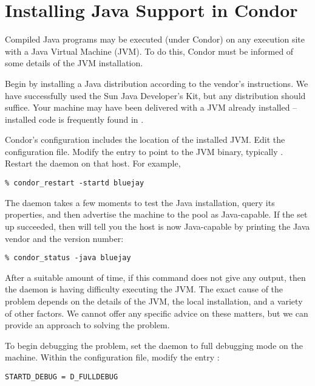 \section{\label{sec:java-install}Installing Java Support in Condor}


Compiled Java programs may be executed (under Condor) on
any
execution site with a
Java Virtual Machine (JVM).
To do this,
Condor must be informed of some details of the
JVM installation.

Begin by installing a Java distribution according to the vendor's
instructions.
We have successfully used the Sun Java Developer's Kit,
but any distribution should suffice.
Your machine may have
been delivered with a JVM already installed -- installed code
is frequently found in .

Condor's configuration includes the location of the installed
JVM.
Edit the configuration file.
Modify the  entry to point to the JVM binary,
typically .
Restart the  daemon on that host.  For example,

\begin{verbatim}
% condor_restart -startd bluejay
\end{verbatim}

The  daemon takes a few moments to test the Java
installation, query its properties, and then advertise the machine
to the pool as Java-capable.
If the set up succeeded, then  will
tell you the host is now Java-capable by printing the Java
vendor and the version number:

\begin{verbatim}
% condor_status -java bluejay
\end{verbatim}

After a suitable amount of time, if this command does not give any output,
then the  daemon is having difficulty executing the JVM.
The exact cause of the problem depends on the details of the
JVM, the local installation, and a variety of other factors.
We cannot offer any specific advice on these matters, but
we can provide an approach to solving the problem.

To begin debugging the problem, set the  daemon
to full debugging mode on the machine.
Within the configuration file, modify the entry :
\begin{verbatim}
STARTD_DEBUG = D_FULLDEBUG
\end{verbatim}

